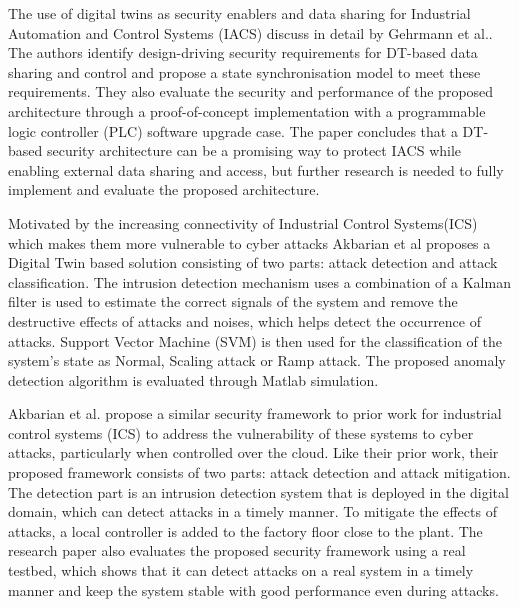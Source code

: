 The use of digital twins as security enablers and data sharing for Industrial Automation and Control Systems (IACS) discuss in detail by Gehrmann et al.\cite{gehrmannDigitalTwinBased2020}. The authors identify design-driving security requirements for DT-based data sharing and control and propose a state synchronisation model to meet these requirements. They also evaluate the security and performance of the proposed architecture through a proof-of-concept implementation with a programmable logic controller (PLC) software upgrade case. The paper concludes that a DT-based security architecture can be a promising way to protect IACS while enabling external data sharing and access, but further research is needed to fully implement and evaluate the proposed architecture.

Motivated by the increasing connectivity of Industrial Control Systems(ICS) which makes them more vulnerable to cyber attacks Akbarian et al\cite{akbarianIntrusionDetectionDigital2020} proposes a Digital Twin based solution consisting of two parts: attack detection and attack classification. The intrusion detection mechanism uses a combination of a Kalman filter is used  to estimate the correct signals of the system and remove the destructive effects of attacks and noises, which helps detect the occurrence of attacks. Support Vector Machine (SVM) is then used for the classification of the system's state as Normal, Scaling attack or Ramp attack. The proposed anomaly detection algorithm is evaluated through Matlab simulation.

Akbarian et al.\cite{akbarianSecurityFrameworkDigital2021} propose a similar security framework to prior work\cite{akbarianIntrusionDetectionDigital2020} for industrial control systems (ICS) to address the vulnerability of these systems to cyber attacks, particularly when controlled over the cloud. Like their prior work, their proposed framework consists of two parts: attack detection and attack mitigation. The detection part is an intrusion detection system that is deployed in the digital domain, which can detect attacks in a timely manner. To mitigate the effects of attacks, a local controller is added to the factory floor close to the plant. The research paper also evaluates the proposed security framework using a real testbed, which shows that it can detect attacks on a real system in a timely manner and keep the system stable with good performance even during attacks.

